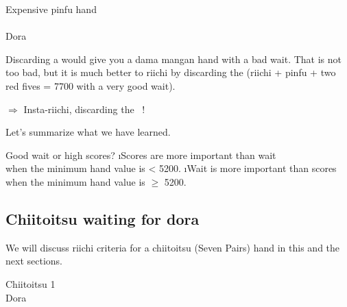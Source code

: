 \bigskip
\begin{itembox}[r]{Expensive {\jap pinfu} hand}
\bp
{}
\\ \vspace{-18pt}
\rfw{}\rfd{}~~\bei\\
\hspace{311pt}\footnotesize{\jap Dora}
\ep
\end{itembox}

\noindent Discarding a {\large{}} would give you a {\jap dama mangan} hand with a bad wait. That is not too bad, but it is much better to {\jap riichi} by discarding the {\large{}} ({\jap riichi} + {\jap pinfu} + two red fives = 7700 with a very good wait). 

\begin{center}
{\large $\Rightarrow$ Insta-{\jap riichi}, discarding the ~!}
\end{center}

\bigskip

\noindent Let's summarize what we have learned. 

\bigskip

\begin{itembox}[c]{Good wait or high scores?}
\bi
\i Scores are more important than wait\\when the minimum hand value is < 5200.
\i Wait is more important than scores\\when the minimum hand value is $\geq$ 5200.
\ei
\end{itembox}

\newpage
\subsection{{\jap Chiitoitsu} waiting for {\jap dora}}
We will discuss {\jap riichi} criteria for a {\jap chiitoitsu} (Seven Pairs) hand in this and the next sections. 

\bigskip
\begin{itembox}[r]{{\jap Chiitoitsu 1}}
\bp
{}\zhong\zhong\fa\fa~~\\
\hspace{310pt}\footnotesize{\jap Dora}
\ep
\vspace{-15pt}
\end{itembox}

